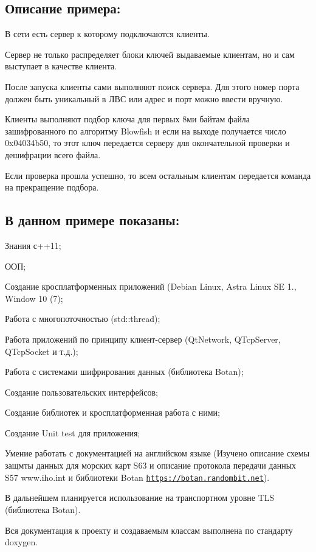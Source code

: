 \subsection*{Описание примера\+:}


\begin{DoxyItemize}
\item В сети есть сервер к которому подключаются клиенты.
\item Сервер не только распределяет блоки ключей выдаваемые клиентам, но и сам выступает в качестве клиента.
\item После запуска клиенты сами выполняют поиск сервера. Для этого номер порта должен быть уникальный в ЛВС или адрес и порт можно ввести вручную.
\item Клиенты выполняют подбор ключа для первых 8ми байтам файла зашифрованного по алгоритму Blowfish и если на выходе получается число 0x04034b50, то этот ключ передается серверу для окончательной проверки и дешифрации всего файла.
\item Если проверка прошла успешно, то всем остальным клиентам передается команда на прекращение подбора.
\end{DoxyItemize}

\subsection*{В данном примере показаны\+:}


\begin{DoxyItemize}
\item Знания с++11;
\item ООП;
\item Создание кросплатформенных приложений (Debian Linux, Astra Linux SE 1., Window 10 (7);
\item Работа с многопоточностью (std\+::thread);
\item Работа приложений по принципу клиент-\/сервер (Qt\+Network, Q\+Tcp\+Server, Q\+Tcp\+Socket и т.\+д.);
\item Работа с системами шифрирования данных (библиотека Botan);
\item Создание пользовательских интерфейсов;
\item Создание библиотек и кросплатформенная работа с ними;
\item Создание Unit test для приложения;
\item Умение работать с документацией на английском языке (Изучено описание схемы защмты данных для морских карт S63 и описание протокола передачи данных S57 www.\+iho.\+int и библиотеки Botan \href{https://botan.randombit.net}{\tt https\+://botan.\+randombit.\+net}).
\item В дальнейшем планируется использование на транспортном уровне T\+LS (библиотека Botan).
\end{DoxyItemize}

Вся документация к проекту и создаваемым классам выполнена по стандарту doxygen. 